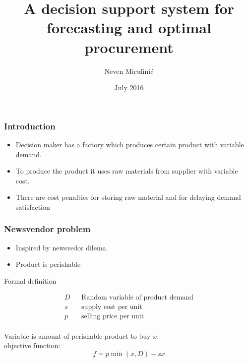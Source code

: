 \documentclass{beamer}
\title{A decision support system for forecasting and optimal procurement}
\author{Neven Miculinić}
\date{July 2016}
\begin{document}
\frame{\titlepage}


\begin{frame}
\frametitle{Introduction}
\begin{itemize}
\item Decision maker has a factory which produces certain product with variable demand.
\item To produce the product it uses raw materials from supplier with variable cost.
\item There are cost penalties for storing raw material and for delaying demand satisfaction
\end{itemize}




\end{frame}


\begin{frame}
    \frametitle{Newsvendor problem}
    \begin{itemize}
        \item Inspired by newsvedor dilema.
        \item Product is perishable
    \end{itemize}

    \begin{block}{Formal definition}

        \begin{align*}
            D && \text{Random variable of product demand} \\
            s && \text{supply cost per unit} \\
            p && \text{selling price per unit} \\
        \end{align*}

        Variable is amount of perishable product to buy $x$.\\
        objective function:
        \begin{equation*}
            f = p\min(x, D) - sx
        \end{equation*}

    \end{block}
\end{frame}
\end{document}
